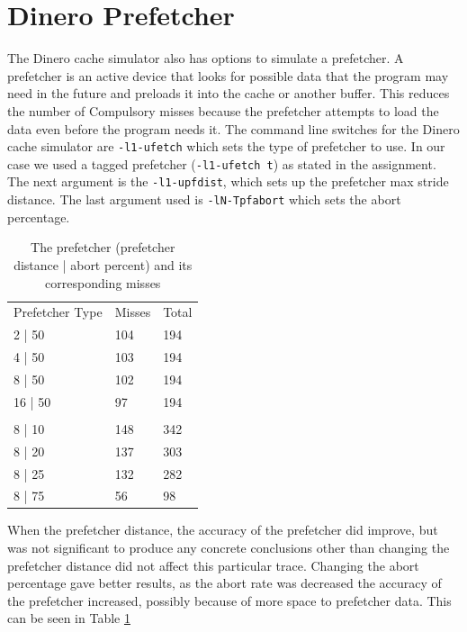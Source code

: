 \documentclass{article}
\begin{document}
	\section{Dinero Prefetcher}
		The Dinero cache simulator also has options to simulate a prefetcher. A prefetcher is an active device that looks for possible data that the program may need in the future and preloads it into the cache or another buffer. This reduces the number of Compulsory misses because the prefetcher attempts to load the data even before the program needs it. The command line switches for the Dinero cache simulator are \verb|-l1-ufetch| which sets the type of prefetcher to use. In our case we used a tagged prefetcher (\verb|-l1-ufetch t|) as stated in the assignment. The next argument is the \verb|-l1-upfdist|, which sets up the prefetcher max stride distance. The last argument used is \verb|-lN-Tpfabort| which sets the abort percentage. 
		
		\begin{table}[H]
			\centering
			\label{din:prefetch_data}
			\begin{tabular}{lll}
			Prefetcher Type & Misses & Total \\
			2 | 50          & 104    & 194   \\
			4 | 50          & 103    & 194   \\
			8 | 50          & 102    & 194   \\
			16 | 50         & 97     & 194   \\
			& & \\
			8 | 10          & 148    & 342   \\
			8 | 20          & 137    & 303   \\
			8 | 25          & 132    & 282   \\
			8 | 75          & 56     & 98   
			\end{tabular}
			\caption{The prefetcher (prefetcher distance | abort percent) and its corresponding misses}		\end{table}
		When the prefetcher distance, the accuracy of the prefetcher did improve, but was not significant to produce any concrete conclusions other than changing the prefetcher distance did not affect this particular trace. Changing the abort percentage gave better results, as the abort rate was decreased the accuracy of the prefetcher increased, possibly because of more space to prefetcher data. This can be seen in Table \ref{din:prefetch_data}
		
\end{document}
